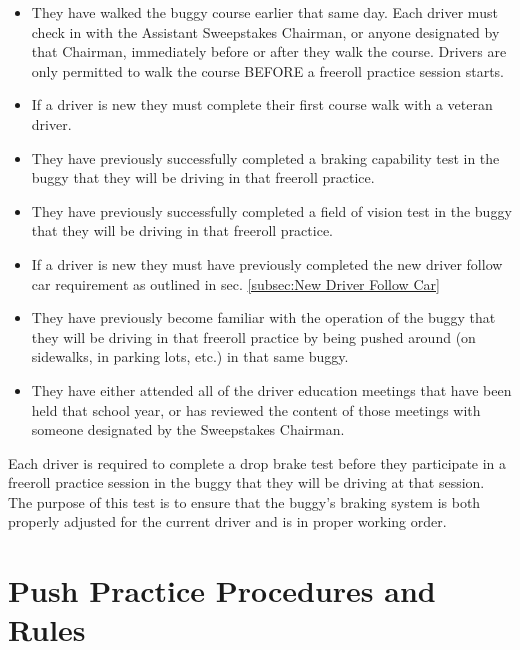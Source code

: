 	\begin{itemize}

		\item
		They have walked the buggy course earlier that same day. Each driver must check in with the Assistant Sweepstakes Chairman, or anyone designated by that Chairman, immediately before or after they walk the course. Drivers are only permitted to walk the course BEFORE a freeroll practice session starts.

		\item		
		If a driver is new they must complete their first course walk with a veteran driver. 

		\item
		They have previously successfully completed a braking capability test in the buggy that they will be driving in that freeroll practice.

		\item
		They have previously successfully completed a field of vision test in the buggy that they will be driving in that freeroll practice.

		\item
        If a driver is new they must have previously completed the new driver follow car requirement as outlined in sec. \ref{subsec:New Driver Follow Car}

		\item
		They have previously become familiar with the operation of the buggy that they will be driving in that freeroll practice by being pushed around (on sidewalks, in parking lots, etc.) in that same buggy.

		\item
		They have either attended all of the driver education meetings that have been held that school year, or has reviewed the content of those meetings with someone designated by the Sweepstakes Chairman.

	\end{itemize}
	
	Each driver is required to complete a drop brake test before they participate in a freeroll practice session in the buggy that they will be driving at that session. The purpose of this test is to ensure that the buggy's braking system is both properly adjusted for the current driver and is in proper working order.
	
\section{Push Practice Procedures and Rules}
\label{sec:PushPRules}

